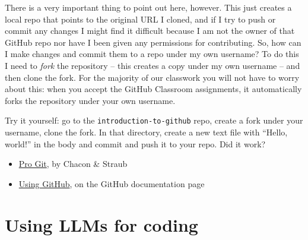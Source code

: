 \documentclass{tufte-book}
\begin{document}
There is a very important thing to point out here, however. This just creates a local repo that points to the original URL I cloned, and if I try to push or commit any changes I might find it difficult because I am not the owner of that GitHub repo nor have I been given any permissions for contributing. So, how can I make changes and commit them to a repo under my own username? To do this I need to \textit{fork} the repository -- this creates a copy under my own username -- and then clone the fork. For the majority of our classwork you will not have to worry about this: when you accept the GitHub Classroom assignments, it automatically forks the repository under your own username. 

Try it yourself: go to the \verb|introduction-to-github| repo, create a fork under your username, clone the fork. In that directory, create a new text file with ``Hello, world!'' in the body and commit and push it to your repo. Did it work?






\begin{itemize}
    \item \href{https://git-scm.com/book/en/v2}{Pro Git}, by Chacon \& Straub
    \item \href{https://docs.github.com/en/get-started/start-your-journey/git-and-github-learning-resources}{Using GitHub}, on the GitHub documentation page
\end{itemize}

\section{Using LLMs for coding}
\end{document}
